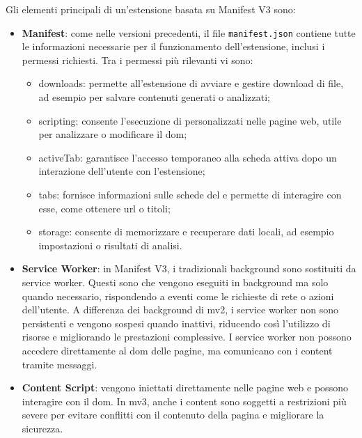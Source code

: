 \noindent Gli elementi principali di un’estensione basata su Manifest V3 sono:
\begin{itemize}
    \item \textbf{Manifest}: come nelle versioni precedenti, il file \texttt{manifest.json} contiene tutte le informazioni necessarie per il funzionamento dell’estensione, inclusi i permessi richiesti. 
    Tra i permessi più rilevanti vi sono: \begin{itemize}
        \item downloads: permette all’estensione di avviare e gestire download di file, ad esempio per salvare contenuti generati o analizzati;
        \item scripting: consente l’esecuzione di  personalizzati nelle pagine web, utile per analizzare o modificare il \acrshort{dom};
        \item activeTab: garantisce l’accesso temporaneo alla scheda attiva dopo un interazione dell’utente con l’estensione;
        \item tabs: fornisce informazioni sulle schede del  e permette di interagire con esse, come ottenere \acrshort{url} o titoli;
        \item storage: consente di memorizzare e recuperare dati locali, ad esempio impostazioni o risultati di analisi.
    \end{itemize}
    \item \textbf{Service Worker}: in Manifest V3, i tradizionali background  sono sostituiti da service worker. Questi sono  che vengono eseguiti in background ma solo quando necessario, rispondendo a eventi come le richieste di rete o azioni dell’utente. A differenza dei background  di \acrshort{mv2}, i service worker non sono persistenti e vengono sospesi quando inattivi, riducendo così l’utilizzo di risorse e migliorando le prestazioni complessive. I service worker non possono accedere direttamente al \acrshort{dom} delle pagine, ma comunicano con i content  tramite messaggi.
    \item \textbf{Content Script}: vengono iniettati direttamente nelle pagine web e possono interagire con il \acrshort{dom}. In \acrshort{mv3}, anche i content  sono soggetti a restrizioni più severe per evitare conflitti con il contenuto della pagina e migliorare la sicurezza.
\end{itemize}
\vspace{0.5cm}
